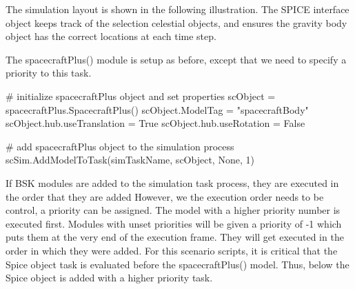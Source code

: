 The simulation layout is shown in the following illustration. The S\+P\+I\+CE interface object keeps track of the selection celestial objects, and ensures the gravity body object has the correct locations at each time step. 

The spacecraft\+Plus() module is setup as before, except that we need to specify a priority to this task. 
\begin{DoxyCode}
\textcolor{comment}{# initialize spacecraftPlus object and set properties}
scObject = spacecraftPlus.SpacecraftPlus()
scObject.ModelTag = \textcolor{stringliteral}{"spacecraftBody"}
scObject.hub.useTranslation = \textcolor{keyword}{True}
scObject.hub.useRotation = \textcolor{keyword}{False}

\textcolor{comment}{# add spacecraftPlus object to the simulation process}
scSim.AddModelToTask(simTaskName, scObject, \textcolor{keywordtype}{None}, 1)
\end{DoxyCode}
 If B\+SK modules are added to the simulation task process, they are executed in the order that they are added However, we the execution order needs to be control, a priority can be assigned. The model with a higher priority number is executed first. Modules with unset priorities will be given a priority of -\/1 which puts them at the very end of the execution frame. They will get executed in the order in which they were added. For this scenario scripts, it is critical that the Spice object task is evaluated before the spacecraft\+Plus() model. Thus, below the Spice object is added with a higher priority task.

